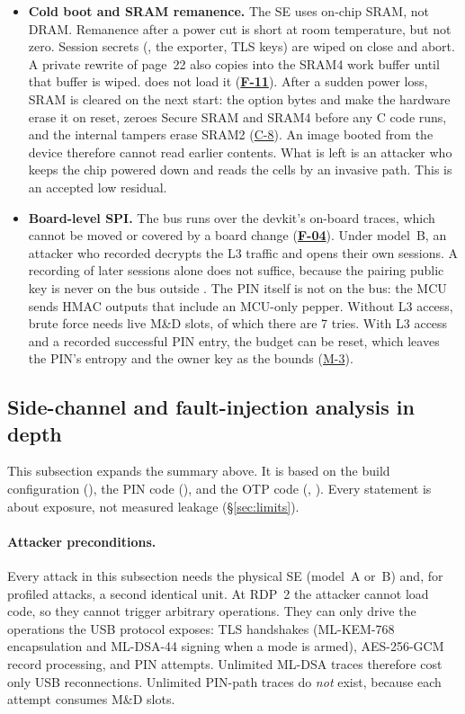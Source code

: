 \documentclass[11pt,a4paper]{article}
\newcommand{\fid}[1]{\textbf{#1}}
\begin{document}
\begin{itemize}
\item \textbf{Cold boot and SRAM remanence.} The SE uses on-chip SRAM, not DRAM. Remanence after a power cut is short at room temperature, but not zero. Session secrets (, the exporter, TLS keys) are wiped on close and abort. A private rewrite of page~22 also copies  into the SRAM4 work buffer until that buffer is wiped.  does not load it (\hyperref[f:F-11]{\fid{F-11}}). After a sudden power loss, SRAM is cleared on the next start: the option bytes  and  make the hardware erase it on reset,  zeroes Secure SRAM and SRAM4 before any C code runs, and the internal tampers erase SRAM2 (\hyperref[c:C-8]{C-8}). An image booted from the device therefore cannot read earlier contents. What is left is an attacker who keeps the chip powered down and reads the cells by an invasive path. This is an accepted low residual.
\item \textbf{Board-level SPI.} The bus runs over the devkit's on-board traces, which cannot be moved or covered by a board change (\hyperref[f:F-04]{\fid{F-04}}). Under model~B, an attacker who recorded  decrypts the L3 traffic and opens their own sessions. A recording of later sessions alone does not suffice, because the pairing public key is never on the bus outside . The PIN itself is not on the bus: the MCU sends HMAC outputs that include an MCU-only pepper. Without L3 access, brute force needs live M\&D slots, of which there are 7 tries. With L3 access and a recorded successful PIN entry, the budget can be reset, which leaves the PIN's entropy and the owner key as the bounds (\hyperref[m:M-3]{M-3}).
\end{itemize}

\subsection{Side-channel and fault-injection analysis in depth}\label{sec:sca}
This subsection expands the summary above. It is based on the build configuration (), the PIN code (), and the OTP code (, ). Every statement is about exposure, not measured leakage (\S\ref{sec:limits}).

\paragraph{Attacker preconditions.} Every attack in this subsection needs the physical SE (model~A or~B) and, for profiled attacks, a second identical unit. At RDP~2 the attacker cannot load code, so they cannot trigger arbitrary operations. They can only drive the operations the USB protocol exposes: TLS handshakes (ML-KEM-768 encapsulation and ML-DSA-44 signing when a mode is armed), AES-256-GCM record processing, and PIN attempts. Unlimited ML-DSA traces therefore cost only USB reconnections. Unlimited PIN-path traces do \emph{not} exist, because each attempt consumes M\&D slots.
\end{document}
